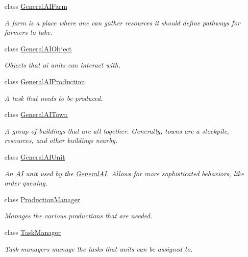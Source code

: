 \begin{DoxyCompactItemize}
class \hyperlink{classai_1_1general_1_1_general_a_i_farm}{GeneralAIFarm}
\begin{DoxyCompactList}\small\item\em A farm is a place where one can gather resources it should define pathways for farmers to take. \end{DoxyCompactList}\item 
class \hyperlink{classai_1_1general_1_1_general_a_i_object}{GeneralAIObject}
\begin{DoxyCompactList}\small\item\em Objects that ai units can interact with. \end{DoxyCompactList}\item 
class \hyperlink{classai_1_1general_1_1_general_a_i_production}{GeneralAIProduction}
\begin{DoxyCompactList}\small\item\em A task that needs to be produced. \end{DoxyCompactList}\item 
class \hyperlink{classai_1_1general_1_1_general_a_i_town}{GeneralAITown}
\begin{DoxyCompactList}\small\item\em A group of buildings that are all together. Generally, towns are a stockpile, resources, and other buildings nearby. \end{DoxyCompactList}\item 
class \hyperlink{classai_1_1general_1_1_general_a_i_unit}{GeneralAIUnit}
\begin{DoxyCompactList}\small\item\em An \hyperlink{classai_1_1_a_i}{AI} unit used by the \hyperlink{classai_1_1general_1_1_general_a_i}{GeneralAI}. Allows for more sophisticated behaviors, like order queuing. \end{DoxyCompactList}\item 
class \hyperlink{classai_1_1general_1_1_production_manager}{ProductionManager}
\begin{DoxyCompactList}\small\item\em Manages the various productions that are needed. \end{DoxyCompactList}\item 
class \hyperlink{classai_1_1general_1_1_task_manager}{TaskManager}
\begin{DoxyCompactList}\small\item\em Task managers manage the tasks that units can be assigned to. \end{DoxyCompactList}\item 

\end{DoxyCompactItemize}
